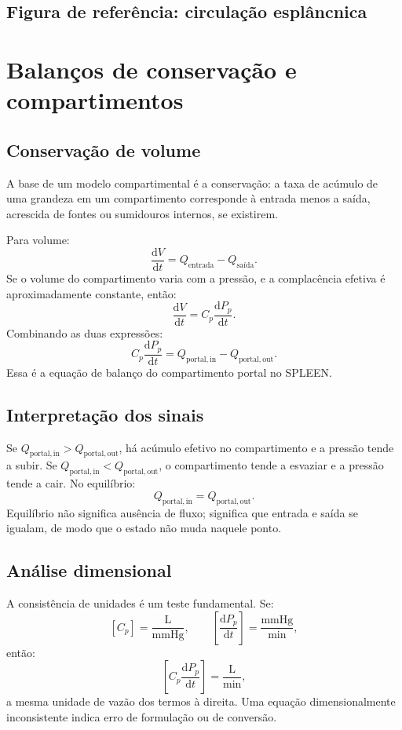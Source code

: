 \documentclass[11pt,a4paper,oneside]{book}
\newcommand{\diff}[2]{\frac{\mathrm{d}#1}{\mathrm{d}#2}}
\newcommand{\Qportin}{Q_{\mathrm{portal,in}}}
\newcommand{\Qportout}{Q_{\mathrm{portal,out}}}
\begin{document}
\section*{Figura de referência: circulação esplâncnica}


\chapter{Balanços de conservação e compartimentos}

\section{Conservação de volume}
A base de um modelo compartimental é a conservação: a taxa de acúmulo de uma grandeza em um compartimento corresponde à entrada menos a saída, acrescida de fontes ou sumidouros internos, se existirem.

Para volume:
\begin{equation}
  \diff{V}{t}=Q_{\mathrm{entrada}}-Q_{\mathrm{saída}}.
  \label{eq:volume-balance}
\end{equation}
Se o volume do compartimento varia com a pressão, e a complacência efetiva é aproximadamente constante, então:
\begin{equation}
  \diff{V}{t}=C_p\diff{P_p}{t}.
\end{equation}
Combinando as duas expressões:
\begin{equation}
  C_p\diff{P_p}{t}=\Qportin-\Qportout.
  \label{eq:portal-ode}
\end{equation}
Essa é a equação de balanço do compartimento portal no SPLEEN.

\section{Interpretação dos sinais}
Se $\Qportin>\Qportout$, há acúmulo efetivo no compartimento e a pressão tende a subir. Se $\Qportin<\Qportout$, o compartimento tende a esvaziar e a pressão tende a cair. No equilíbrio:
\begin{equation}
  \Qportin=\Qportout.
\end{equation}
Equilíbrio não significa ausência de fluxo; significa que entrada e saída se igualam, de modo que o estado não muda naquele ponto.

\section{Análise dimensional}
A consistência de unidades é um teste fundamental. Se:
\[
[C_p]=\frac{\mathrm{L}}{\mathrm{mmHg}},\qquad
\left[\diff{P_p}{t}\right]=\frac{\mathrm{mmHg}}{\mathrm{min}},
\]
então:
\[
\left[C_p\diff{P_p}{t}\right]=\frac{\mathrm{L}}{\mathrm{min}},
\]
a mesma unidade de vazão dos termos à direita. Uma equação dimensionalmente inconsistente indica erro de formulação ou de conversão.
\end{document}
